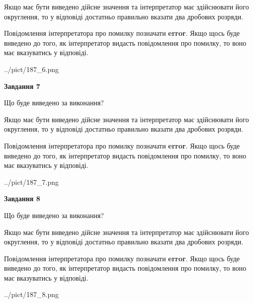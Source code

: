 \documentclass[12pt, ukrainian]{article}
\begin{document}
{\begin {Large}
Якщо має бути виведено дійсне значення та інтерпретатор має здійснювати його округлення, 
то у відповіді достатньо правильно вказати два дробових розряди.

Повідомлення інтерпретатора про помилку позначати \textbf{error}.
Якщо щось буде виведено до того, як інтерпретатор видасть повідомлення про помилку, 
то воно має вказуватись у відповіді. \par

\begin{center}
	{../pict/187_6.png}
\end{center}
\newpage

{\begin {center}\textbf{Завдання 7}\end {center}}\par
Що буде виведено за виконання? \par

Якщо має бути виведено дійсне значення та інтерпретатор має здійснювати його округлення, 
то у відповіді достатньо правильно вказати два дробових розряди.

Повідомлення інтерпретатора про помилку позначати \textbf{error}.
Якщо щось буде виведено до того, як інтерпретатор видасть повідомлення про помилку, 
то воно має вказуватись у відповіді. \par

\begin{center}
	{../pict/187_7.png}
\end{center}
\newpage

{\begin {center}\textbf{Завдання 8}\end {center}}\par
Що буде виведено за виконання? \par

Якщо має бути виведено дійсне значення та інтерпретатор має здійснювати його округлення, 
то у відповіді достатньо правильно вказати два дробових розряди.

Повідомлення інтерпретатора про помилку позначати \textbf{error}.
Якщо щось буде виведено до того, як інтерпретатор видасть повідомлення про помилку, 
то воно має вказуватись у відповіді. \par

\begin{center}
	{../pict/187_8.png}
\end{center}
\newpage


\end{Large}}
\end{document}

